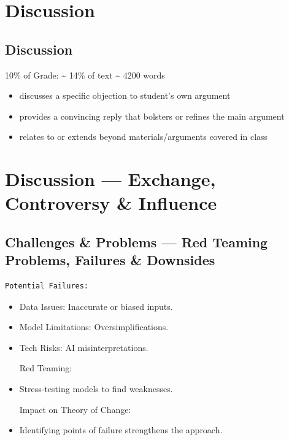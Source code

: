 \documentclass[
  letterpaper,
]{book}
\providecommand{\tightlist}{%
  \setlength{\itemsep}{0pt}\setlength{\parskip}{0pt}}
\begin{document}

\chapter{Discussion}\label{discussion}

\section{Discussion}\label{discussion-1}

10\% of Grade: \textasciitilde{} 14\% of text \textasciitilde{} 4200
words

\begin{itemize}
\tightlist
\item
  discusses a specific objection to student's own argument
\item
  provides a convincing reply that bolsters or refines the main argument
\item
  relates to or extends beyond materials/arguments covered in class
\end{itemize}


\chapter{Discussion --- Exchange, Controversy \&
Influence}\label{discussion-exchange-controversy-influence}

\section{Challenges \& Problems --- Red Teaming Problems, Failures \&
Downsides}\label{challenges-problems-red-teaming-problems-failures-downsides}

\begin{verbatim}
Potential Failures:
\end{verbatim}

\begin{itemize}
\item
  Data Issues: Inaccurate or biased inputs.\\
\item
  Model Limitations: Oversimplifications.\\
\item
  Tech Risks: AI misinterpretations.

  Red Teaming:
\item
  Stress-testing models to find weaknesses.

  Impact on Theory of Change:
\item
  Identifying points of failure strengthens the approach.
\end{itemize}
\end{document}
